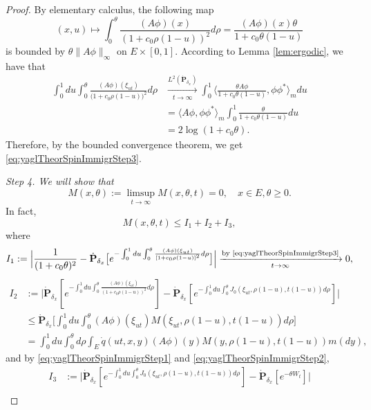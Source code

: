 \documentclass[UTF8]{pkuthss}
\theoremstyle{plain}
\theoremstyle{definition}
\numberwithin{equation}{section}
\begin{document}
\begin{proof}
	By elementary calculus, the following map
\[
	(x,u)
	\mapsto\int_0^\theta \frac{ (A\phi)(x)}{(1+c_0\rho(1-u))^2} d\rho
	= \frac{ (A\phi)(x)\theta}{1+c_0\theta(1-u)}
\]
	is bounded by $\theta\| A\phi\|_\infty$ on $E\times[0,1]$.
	According to Lemma \ref{lem:ergodic}, we have that
\begin{align}
	\int_0^1 du \int_0^\theta \frac{ (A\phi)(\xi_{ut})}{\big(1+c_0\rho(1-u)\big)^2} d\rho
	&\xrightarrow[t\to\infty]{L^2(\dot{\mathbf P}_{\delta_x})} \int_0^1 \big\langle \frac{\theta A\phi}{1+c_0\theta(1-u)},\phi\phi^* \big\rangle_m du\\
	&= \langle  A\phi,\phi\phi^*\rangle_m\int_0^1 \frac{\theta}{1+c_0\theta(1-u)}du \\
	&=2\log(1+c_0\theta).
\end{align}
	Therefore, by the bounded convergence theorem, we get \eqref{eq:yaglTheorSpinImmigrStep3}.
\par
	\emph{Step 4. We will show that}
\begin{equation}\label{eq:yaglTheorSpinImmigrStep4}
	M(x,\theta)
	:=\limsup_{t\to\infty}M(x,\theta,t)=0,
	\quad x\in E,\theta\geq 0.
\end{equation}
	In fact,
\begin{equation}\label{eq:separate-M-into-3-parts}
	M(x,\theta,t)
	\leq I_1+I_2+I_3,
\end{equation}
	where
\[
	I_1
	:=\Big|\frac{1}{(1+c_0\theta)^2}- \dot {\mathbf P}_{\delta_x} \big[e^{- \int_0^1 du \int_0^\theta \frac{ (A\phi)(\xi_{ut})}{[1+c_0\rho(1-u)]^2}d\rho }\big]\Big|
	\xrightarrow[t\to\infty]{\text{by \eqref{eq:yaglTheorSpinImmigrStep3}}} 0,
\]
\begin{align}
	I_2
	&:=\Big| \dot {\mathbf P}_{\delta_x} [e^{- \int_0^1 du \int_0^\theta  \frac{ (A\phi)(\xi_{ut})}{(1+c_0\rho(1-u))^2} d\rho}]-\dot{\mathbf P}_{\delta_x}[e^{-\int_0^1 du\int_0^{\theta} J_0(\xi_{ut},\rho(1-u),t(1-u)) d\rho}]\Big|\\
	&\leq\dot{\mathbf P}_{\delta_x}\Big[\int_0^1du\int_0^\theta (A\phi)(\xi_{ut})M(\xi_{ut},\rho(1-u),t(1-u))d\rho \Big]\\
	&=\int_0^1du\int_0^\theta d\rho \int_{E} \dot{q}(ut,x,y) (A\phi)(y)M(y,\rho(1-u),t(1-u)) m(dy),
\end{align}
	and by \eqref{eq:yaglTheorSpinImmigrStep1} and \eqref{eq:yaglTheorSpinImmigrStep2},
\begin{align}
	I_3
	&:=\big|\dot{\mathbf P}_{\delta_x}[e^{-\int_0^1 du\int_0^{\theta} J_0(\xi_{ut},\rho(1-u),t(1-u)) d\rho }]-\dot{\mathbf P}_{\delta_x}[e^{-\theta W_t}]\big|\\

\end{align}
\end{proof}
\end{document}
